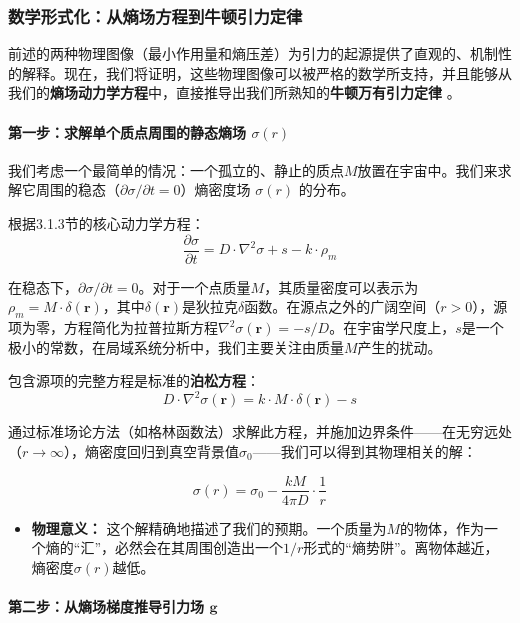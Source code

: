 \documentclass[11pt, a4paper]{article}
\begin{document}
\subsubsection{数学形式化：从熵场方程到牛顿引力定律}

前述的两种物理图像（最小作用量和熵压差）为引力的起源提供了直观的、机制性的解释。现在，我们将证明，这些物理图像可以被严格的数学所支持，并且能够从我们的\textbf{熵场动力学方程}中，直接推导出我们所熟知的\textbf{牛顿万有引力定律} \cite{Newton1687}。

\paragraph{第一步：求解单个质点周围的静态熵场 $\sigma(r)$}

我们考虑一个最简单的情况：一个孤立的、静止的质点$M$放置在宇宙中。我们来求解它周围的稳态（$\partial\sigma/\partial t = 0$）熵密度场 $\sigma(r)$ 的分布。

根据3.1.3节的核心动力学方程：
\[
\frac{\partial\sigma}{\partial t} = D \cdot \nabla^2\sigma + s - k \cdot \rho_m
\]

在稳态下，$\partial\sigma/\partial t = 0$。对于一个点质量$M$，其质量密度可以表示为 $\rho_m = M \cdot \delta(\mathbf{r})$，其中$\delta(\mathbf{r})$是狄拉克$\delta$函数。在源点之外的广阔空间（$r > 0$），源项为零，方程简化为拉普拉斯方程$\nabla^2\sigma(\mathbf{r}) = -s/D$。在宇宙学尺度上，$s$是一个极小的常数，在局域系统分析中，我们主要关注由质量$M$产生的扰动。

包含源项的完整方程是标准的\textbf{泊松方程}：
\[
D \cdot \nabla^2\sigma(\mathbf{r}) = k \cdot M \cdot \delta(\mathbf{r}) - s
\]

通过标准场论方法（如格林函数法）求解此方程，并施加边界条件——在无穷远处（$r\to\infty$），熵密度回归到真空背景值$\sigma_0$——我们可以得到其物理相关的解：

\[
\sigma(r) = \sigma_0 - \frac{kM}{4\pi D} \cdot \frac{1}{r}
\]

\begin{itemize}
    \item \textbf{物理意义：} 这个解精确地描述了我们的预期。一个质量为$M$的物体，作为一个熵的“汇”，必然会在其周围创造出一个$1/r$形式的“熵势阱”。离物体越近，熵密度$\sigma(r)$越低。
\end{itemize}

\paragraph{第二步：从熵场梯度推导引力场 $\mathbf{g}$}
\end{document}
